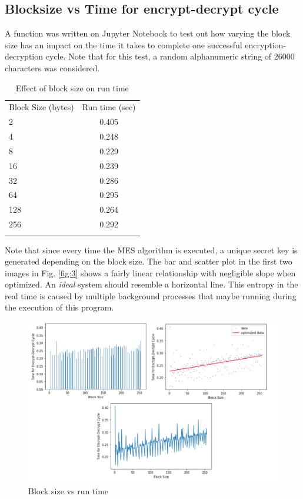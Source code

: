 \subsection{Blocksize vs Time for encrypt-decrypt cycle}
\label{subsec:10.2}
A function was written on Jupyter Notebook to test out how varying the block size has an impact on the time it takes to complete one successful encryption-decryption cycle. Note that for this test, a random alphanumeric string of $26000$ characters was considered.

\begin{table}[htbp!]
\caption{Effect of block size on run time}
\label{tab:4}       %
\centering
\begin{tabular}{lc}
\hline\noalign{\smallskip}
Block Size (bytes) & Run time (sec)\\
\noalign{\smallskip}\hline\noalign{\smallskip}
2	& 0.405\\
4	& 0.248\\
8	& 0.229\\
16	& 0.239\\
32	& 0.286\\
64	& 0.295\\
128	& 0.264\\
256	& 0.292\\
\noalign{\smallskip}\hline
\end{tabular}
\end{table}

\FloatBarrier
Note that since every time the MES algorithm is executed, a unique secret key is generated depending on the block size. The bar and scatter plot in the first two images in Fig. \ref{fig:3} shows a fairly linear relationship with negligible slope when optimized. An \textit{ideal} system should resemble a horizontal line. This entropy in the real time is caused by multiple background processes that maybe running during the execution of this program.

    \begin{figure}[hbt!]
    \centering
        \includegraphics[scale=0.558]{images/fig4.jpg}
        \caption{Block size vs run time}
        \label{fig:4}       %
    \end{figure}

